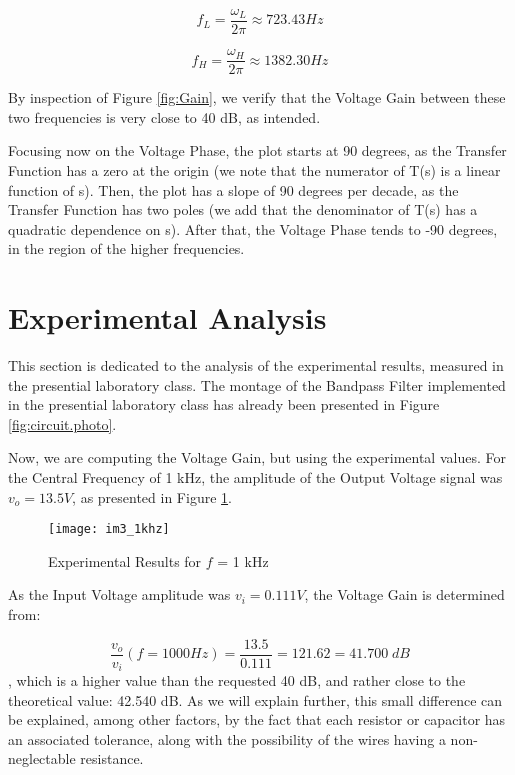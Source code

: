 \begin{equation}
	f_L = \frac{\omega_L}{2\pi} \approx 723.43 Hz
	\label{eq:lowerFreq}
\end{equation}

\begin{equation}
	f_H = \frac{\omega_H}{2\pi} \approx 1382.30 Hz
	\label{eq:higherFreq}
\end{equation}

By inspection of Figure \ref{fig:Gain}, we verify that the Voltage Gain between these two frequencies is very close to 40 dB, as intended. 

Focusing now on the Voltage Phase, the plot starts at 90 degrees, as the Transfer Function has a zero at the origin (we note that the numerator of T(s) is a linear function of s). Then, the plot has a slope of 90 degrees per decade, as the Transfer Function has two poles (we add that the denominator of T(s) has a quadratic dependence on s). After that, the Voltage Phase tends to -90 degrees, in the region of the higher frequencies.


\section{Experimental Analysis}		\label{sec:experimental}

This section is dedicated to the analysis of the experimental results, measured in the presential laboratory class.
The montage of the Bandpass Filter implemented in the presential laboratory class has already been presented in Figure \ref{fig:circuit.photo}.

Now, we are computing the Voltage Gain, but using the experimental values.
For the Central Frequency of 1 kHz, the amplitude of the Output Voltage signal was $v_o = 13.5 V$, as presented in Figure \ref{fig:exp1kHz}. 

\FloatBarrier
\begin{figure}[h] \centering
	\texttt{[image: im3\_1khz]}
	\caption{Experimental Results for $f$ = 1 kHz}
	\label{fig:exp1kHz}
\end{figure}
\FloatBarrier



As the Input Voltage amplitude was $v_i = 0.111 V$, the Voltage Gain is determined from:

\begin{equation}
	\frac{v_o}{v_i}(f = 1000 Hz) = \frac{13.5}{0.111} = 121.62 = 41.700\;dB
	\label{eq:gainCentralExp}
\end{equation} 
, which is a higher value than the requested 40 dB, and rather close to the theoretical value: 42.540 dB. As we will explain further, this small difference can be explained, among other factors, by the fact that each resistor or capacitor has an associated tolerance, along with the possibility of the wires having a non-neglectable resistance.   

